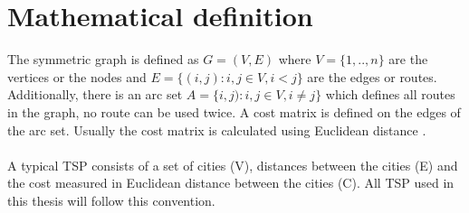 \section{Mathematical definition}
The symmetric graph is defined as $G=(V,E)$ where $V=\{1,..,n\}$ are the vertices or the nodes and $E=\{(i,j):i,j\in V, i<j\}$ are the edges or routes. Additionally, there is an arc set $A=\{i,j):i,j\in V, i\neq j\}$ which defines all routes in the graph, no route can be used twice. A cost matrix is defined on the edges of the arc set. Usually the cost matrix is calculated using Euclidean distance \cite{Matai10}.\\\\
A typical TSP consists of a set of cities (V), distances between the cities (E) and the cost measured in Euclidean distance between the cities (C). All TSP used in this thesis will follow this convention. 


 


